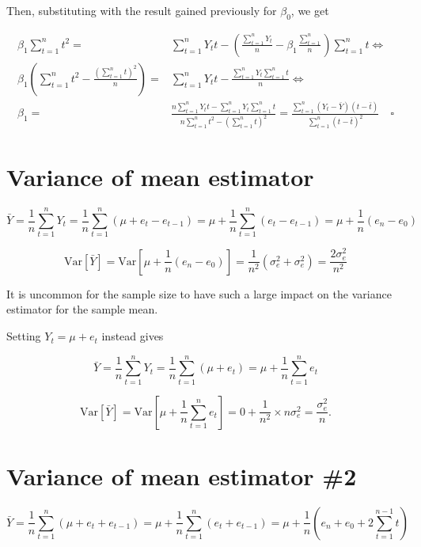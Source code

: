 \documentclass[]{book}
\theoremstyle{definition}
\theoremstyle{definition}
\theoremstyle{remark}
\begin{document}
Then, substituting with the result gained previously for \(\beta_0\), we
get

\begin{align*}
\beta_1 \sum_{t=1}^n t^2 = & \sum_{t=1}^n Y_t t - 
 \left( \frac{\sum_{t=1}^n Y_t}{n} - \beta_1 \frac{\sum_{t=1}^n}{n} \right)
 \sum_{t=1}^n t \iff \\
\beta_1 \left( \sum_{t=1}^n t^2 - \frac{(\sum_{t=1}^n t)^2}{n} \right) = & 
  \sum_{t=1}^n Y_t t - \frac{\sum_{t=1}^n Y_t \sum_{t=1}^n t}{n} \iff \\
\beta_1 = & \frac{n\sum_{t=1}^n Y_tt - \sum_{t=1}^nY_t \sum_{t=1}^n t}{n \sum_{t=1}^n t^2 - \left( \sum_{t=1}^n t \right)^2} = 
  \frac{\sum_{t=1}^n (Y_t - \bar{Y})(t-\bar{t})}{\sum_{t=1}^n (t-\bar{t})^2} \quad \square
\end{align*}

\section{Variance of mean estimator}\label{variance-of-mean-estimator}

\[
  \bar{Y} = \frac{1}{n}\sum_{t=1}^n Y_t = \frac{1}{n} \sum_{t=1}^n(\mu + e_t - e_{t-1}) = 
    \mu + \frac{1}{n} \sum_{t=1}^n (e_t - e_{t-1}) = \mu + \frac{1}{n}(e_n - e_0)
\]

\[
  \text{Var}[\bar{Y}] = \text{Var}[\mu + \frac{1}{n}(e_n - e_0)] =
    \frac{1}{n^2}(\sigma_e^2 + \sigma_e^2) = \frac{2\sigma_e^2}{n^2}
\]

It is uncommon for the sample size to have such a large impact on the
variance estimator for the sample mean.

Setting \(Y_t = \mu + e_t\) instead gives

\[
  \bar{Y} = \frac{1}{n}\sum_{t=1}^n Y_t = \frac{1}{n} \sum_{t=1}^n(\mu + e_t) = 
    \mu + \frac{1}{n} \sum_{t=1}^n e_t
\]

\[
  \text{Var}[\bar{Y}] = \text{Var} \left[ \mu + \frac{1}{n} \sum_{t=1}^n e_t \right] =
    0 + \frac{1}{n^2} \times n \sigma_e^2 = \frac{\sigma_e^2}{n}.
\]

\section{Variance of mean estimator
\#2}\label{variance-of-mean-estimator-2}

\[
  \bar{Y} = \frac{1}{n} \sum_{t=1}^n(\mu + e_t + e_{t-1}) = 
    \mu + \frac{1}{n} \sum_{t=1}^n (e_t + e_{t-1}) = \mu + \frac{1}{n} \left( e_n + e_0 + 2 \sum_{t=1}^{n-1} t \right)
\]
\end{document}
